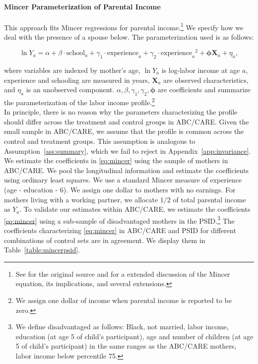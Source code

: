 \paragraph{Mincer Parameterization of Parental Income} \label{appendix:mincerpar}

\noindent This approach fits Mincer regressions for parental income.\footnote{See \citet{Mincer_1974_schooling} for the original source and \citet{Heckman_Lochner_ea_2006_HEE} for a extended discussion of the Mincer equation, its implications, and several extensions.} We specify how we deal with the presence of a spouse below. The parameterization used is as follows:

\begin{equation}
\ln Y_{a} = \alpha + \beta \cdot \text{school}_{a} + \gamma_{1}  \cdot \text{experience}_{a} + \gamma_{2} \cdot {\text{experience}_{a}}^2 + \bm{\phi} \mathbf{X}_{a} + \eta_{a}, \label{eq:mincer}
\end{equation}

\noindent where variables are indexed by mother's age, $\ln Y_a$ is log-labor income at age $a$, experience and schooling are measured in years, $ \mathbf{X}_{a}$ are observed characteristics, and $\eta_{a}$ is an unobserved component. $\alpha, \beta, \gamma_{1}, \gamma_{2}, \bm{\phi}$ are coefficients and summarize the parameterization of the labor income profile.\footnote{We assign one dollar of income when parental income is reported to be zero.}\\

\noindent In principle, there is no reason why the parameters characterizing the profile should differ across the treatment and control groups in ABC/CARE. Given the small sample in ABC/CARE, we assume that the profile is common across the control and treatment groups. This assumption is analogous to Assumption~\ref{ass:summary}, which we fail to reject in Appendix~\ref{app:invariance}.\\

\noindent We estimate the coefficients in \eqref{eq:mincer} using the sample of mothers in ABC/CARE. We pool the longitudinal information and estimate the coefficients using ordinary least squares. We use a standard Mincer measure of experience (age - education - 6). We assign one dollar to mothers with no earnings. For mothers living with a working partner, we allocate $1/2$ of total parental income as $Y_{a}$. To validate our estimates within ABC/CARE, we estimate the coefficients \eqref{eq:mincer} using a sub-sample of disadvantaged mothers in the PSID.\footnote{We define disadvantaged as follows: Black, not married, labor income, education (at age 5 of child's participant), age and number of children (at age 5 of child's participant) in the same ranges as the ABC/CARE mothers, labor income below percentile 75.} The coefficients characterizing \eqref{eq:mincer} in ABC/CARE and PSID for different combinations of control sets are in agreement. We display them in Table~\ref{table:mincerpsid}.\\

